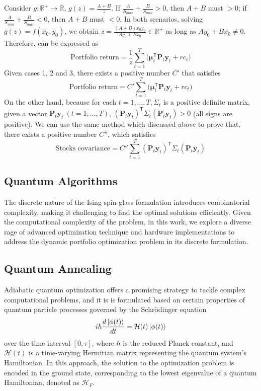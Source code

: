 Consider $g:\mathbb{R}^+ \rightarrow \mathbb{R}$,  $g(z)=\frac{A+B}{z}$. If $\frac{A}{S_{max}}+\frac{B}{S_{min}} > 0$, then $A+B$ must $>0$; if $\frac{A}{S_{min}}+\frac{B}{S_{max}} < 0$, then $A+B$ must $<0$. In both scenarios, solving $g(z)=f(x_0,y_0)$, we obtain $z=\frac{(A+B)x_0y_0}{Ay_0+Bx_0}\in\mathbb{R}^+$ as long as $Ay_0+Bx_0\neq 0$. Therefore,  can be expressed as
\begin{equation}
    \text{Portfolio return}=\frac{1}{z}\sum_{t=1}^T\Big(\boldsymbol{\mu}_t^{\mathsf{T}}\mathbf{P}_t\mathbf{y}_t+rc_t\Big)
\end{equation}
Given cases 1, 2 and 3, there exists a positive number $C'$ that satisfies
\begin{equation}
    \text{Portfolio return}=C'\sum_{t=1}^T\Big(\boldsymbol{\mu}_t^{\mathsf{T}}\mathbf{P}_t\mathbf{y}_t+rc_t\Big)
\end{equation}
On the other hand, because for each $t=1,...,T, \Sigma_t$ is a positive definite matrix, given a vector $\mathbf{P}_t \mathbf{y}_t \ (t=1,...,T)$, $(\mathbf{P}_t \mathbf{y}_t)^{\mathsf{T}}\Sigma_t(\mathbf{P}_t \mathbf{y}_t)>0$ (all signs are positive). We can use the same method which discussed above to prove that, there exists a positive number $C''$, which satisfies
\begin{equation}
    \text{Stocks covariance}=C''\sum_{t=1}^T(\mathbf{P}_t \mathbf{y}_t)^{\mathsf{T}}\Sigma_t(\mathbf{P}_t \mathbf{y}_t)
\end{equation}

\subsection{Quantum Algorithms}
The discrete nature of the Ising spin-glass formulation introduces combinatorial complexity, making it challenging to find the optimal solutions efficiently. Given the computational complexity of the problem, in this work, we explore a diverse rage of advanced optimization technique and hardware implementations to address the dynamic portfolio optimization problem in its discrete formulation.

\subsection*{Quantum Annealing} 
Adiabatic quantum optimization \citep{mcgeoch2022adiabatic} offers a promising strategy to tackle complex computational problems, and it is is formulated based on certain properties of quantum particle processes governed by the Schrödinger equation
\begin{align} \label{equation: Schrodinger}
    i\hbar \frac{d\ket{\phi(t)}}{dt}=\mathcal{H}(t)\ket{\phi(t)}
\end{align}
over the time interval $[0,\tau]$, where $\hbar$ is the reduced Planck constant, and $\mathcal{H}(t)$ is a time-varying Hermitian matrix representing the quantum system's Hamiltonian. In this approach, the solution to the optimization problem is encoded in the ground state, corresponding to the lowest eigenvalue of a quantum Hamiltonian, denoted as $\mathcal{H}_F$. 

